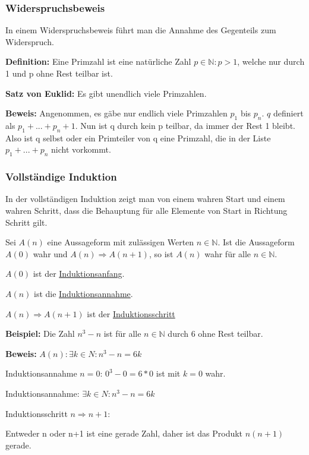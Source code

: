 \documentclass[pdftex,12pt,a4paper,fleqn]{scrartcl}
\begin{document}
\subsubsection{Widerspruchsbeweis} %
\label{ssub:widerspruchsbeweis}

In einem Widerspruchsbeweis führt man die Annahme des Gegenteils zum Widerspruch.

\textbf{Definition:} Eine Primzahl ist eine natürliche Zahl $p \in \mathbb{N}: p > 1$, welche nur durch 1 und p ohne Rest teilbar ist.

\textbf{Satz von Euklid:} Es gibt unendlich viele Primzahlen.

\textbf{Beweis:} Angenommen, es gäbe nur endlich viele Primzahlen $p_1$ bis $p_n$. $q$ definiert als $p_1+...+p_n+1$. Nun ist q durch kein p teilbar, da immer der Rest 1 bleibt. Also ist q selbst oder ein Primteiler von q eine Primzahl, die in der Liste $p_1+...+p_n$ nicht vorkommt.


\subsubsection{Vollständige Induktion} %
\label{ssub:vollst_ndige_induktion}

In der vollständigen Induktion zeigt man von einem wahren Start und einem wahren Schritt, dass die Behauptung für alle Elemente von Start in Richtung Schritt gilt.

Sei $A(n)$ eine Aussageform mit zulässigen Werten $n \in \mathbb{N}$. Ist die Aussageform $A(0)$ wahr und $A(n) \Rightarrow A(n+1)$, so ist $A(n)$ wahr für alle $n \in \mathbb{N}$.

$A(0)$ ist der \underline{Induktionsanfang}.

$A(n)$ ist die \underline{Induktionsannahme}.

$A(n) \Rightarrow A(n+1)$ ist der \underline{Induktionsschritt}

\textbf{Beispiel:} Die Zahl $n^3-n$ ist für alle $n \in \mathbb{N}$ durch 6 ohne Rest teilbar.

\textbf{Beweis:} $A(n): \exists k \in N: n^3-n=6k$

Induktionsannahme $n = 0$: $0^3-0=6*0$ ist mit $k=0$ wahr.

Induktionsannahme: $\exists k \in N: n^3-n = 6k$

Induktionsschritt $n \Rightarrow n+1$:  

Entweder n oder n+1 ist eine gerade Zahl, daher ist das Produkt $n(n+1)$ gerade.
\end{document}
